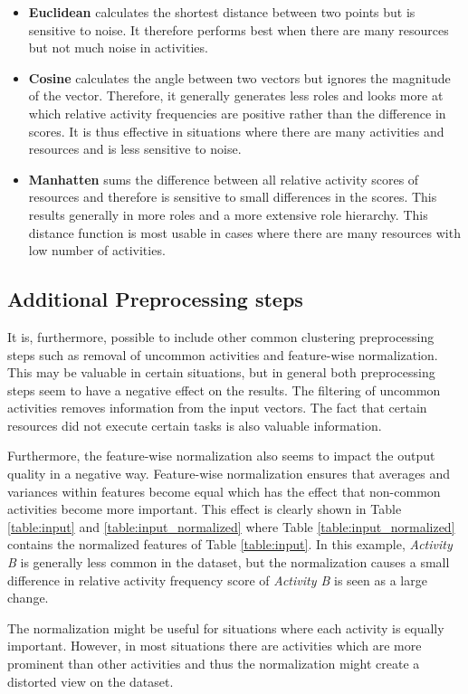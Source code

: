 \begin{itemize}
\item \textbf{Euclidean} calculates the shortest distance between two points but is  sensitive to noise. It therefore performs best when there are many resources but not much noise in activities. 
\item \textbf{Cosine} calculates the angle between two vectors but ignores the magnitude of the vector. Therefore, it generally generates less roles and looks more at which relative activity frequencies are positive rather than the difference in scores. It is thus effective in situations where there are many activities and resources and is less sensitive to noise.
\item \textbf{Manhatten} sums the difference between all relative activity scores of resources and therefore is sensitive to small differences in the scores. This results generally in more roles and a more extensive role hierarchy. This distance function is most usable in cases where there are many resources with low number of activities.   
\end{itemize}

\subsection{Additional Preprocessing steps}
It is, furthermore, possible to include other common clustering preprocessing steps such as removal of uncommon activities and feature-wise normalization. This may be valuable in certain situations, but in general both preprocessing steps seem to have a negative effect on the results. The filtering of uncommon activities removes information from the input vectors. The fact that certain resources did not execute certain tasks is also valuable information. 

Furthermore, the feature-wise normalization also seems to impact the output quality in a negative way. Feature-wise normalization ensures that averages and variances within features become equal which has the effect that non-common activities become more important. This effect is clearly shown in Table \ref{table:input} and \ref{table:input_normalized} where Table \ref{table:input_normalized} contains the normalized features of Table \ref{table:input}. In this example, \textit{Activity B} is generally less common in the dataset, but the normalization causes a small difference in relative activity frequency score of \textit{Activity B} is seen as a large change. 

The normalization might be useful for situations where each activity is equally important. However, in most situations there are activities which are more prominent than other activities and thus the normalization might create a distorted view on the dataset. 

